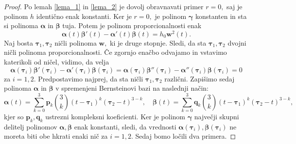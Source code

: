 \documentclass[12pt,a4paper,twoside]{article}
\theoremstyle{definition} %
\theoremstyle{plain} %
\theoremstyle{primerstyle}
\numberwithin{equation}{section}  %
\newcommand{\pV}{\mathbf{p}}
\newcommand{\qV}{\mathbf{q}}
\newcommand{\wV}{\mathbf{w}}
\newcommand{\balpha}{\boldsymbol \alpha}
\newcommand{\bbeta}{\boldsymbol \beta}
\newcommand{\bgamma}{\boldsymbol \gamma}
\newcommand{\btau}{\boldsymbol \tau}
\begin{document}
\begin{proof}
	Po lemah \ref{lema_1} in \ref{lema_2} je dovolj obravnavati primer $r=0,$ saj je polinom $h$ identično enak konstanti. Ker je $r=0,$ je polinom $\bgamma$ konstanten in sta si polinoma $\balpha$ in $\bbeta$ tuja. Potem je polinom proporcionalnosti enak
	\begin{equation}
		\balpha(t)\bbeta'(t)-\balpha'(t)\bbeta(t)=h_0\wV^2(t).
	\end{equation}
	Naj bosta $\btau_1,\btau_2$ ničli polinoma $\wV,$ ki je druge stopnje. Sledi, da sta $\btau_1,\btau_2$ dvojni ničli polinoma proporcionalnosti. Če zgornjo enačbo odvajamo in vstavimo katerikoli od ničel, vidimo, da velja
	\begin{equation}
		\label{enacbe_propoly_tau}
		\balpha(\btau_i)\bbeta'(\btau_i)-\balpha'(\btau_i)\bbeta(\btau_i)=\balpha(\btau_i)\bbeta''(\btau_i)-\balpha''(\btau_i)\bbeta(\btau_i)=0
	\end{equation}
	za $i=1,2.$ Predpostavimo najprej, da sta ničli $\btau_1,\btau_2$ različni. Zapišimo sedaj polinoma $\balpha$ in $\bbeta$ v spremenjeni Bernsteinovi bazi na naslednji način:
	\begin{equation*}
		\balpha(t)=\sum_{k=0}^3\pV_k\binom{3}{k}(t-\btau_1)^k(\btau_2-t)^{3-k},\quad\bbeta(t)=\sum_{k=0}^3\qV_k\binom{3}{k}(t-\btau_1)^k(\btau_2-t)^{3-k},
	\end{equation*}
	kjer so $\pV_k,\qV_k$ ustrezni kompleksni koeficienti. Ker je polinom $\bgamma$ največji skupni delitelj polinomov $\balpha,\bbeta$ enak konstanti, sledi, da vrednosti $\balpha(\btau_i),\bbeta(\btau_i)$ ne moreta biti obe hkrati enaki nič za $i=1,2.$ Sedaj bomo ločili dva primera.
	

\end{proof}
\end{document}
